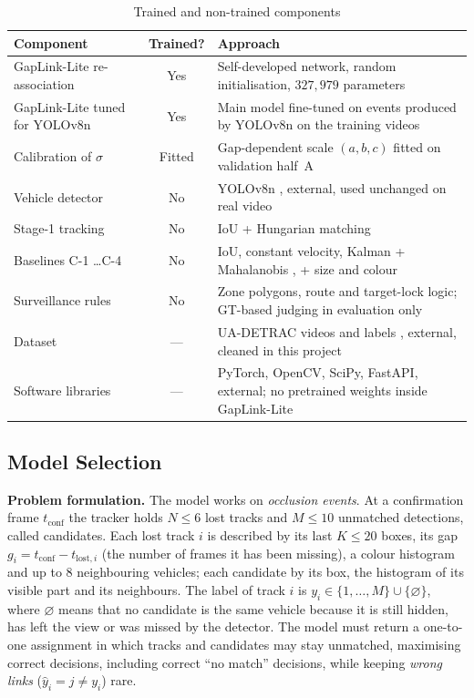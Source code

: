\begin{table}[H]
    \centering
    \caption{Trained and non-trained components}
    \label{tab:trained_components}
    \begin{tabularx}{\textwidth}{l c X}
        \toprule
        \textbf{Component} & \textbf{Trained?} & \textbf{Approach} \\
        \midrule
        GapLink-Lite re-association & Yes & Self-developed network, random initialisation, $327{,}979$ parameters \\
        GapLink-Lite tuned for YOLOv8n & Yes & Main model fine-tuned on events produced by YOLOv8n on the training videos \\
        Calibration of $\sigma$ & Fitted & Gap-dependent scale $(a,b,c)$ fitted on validation half~A \\
        Vehicle detector & No & YOLOv8n \cite{jocher2023yolov8}, external, used unchanged on real video \\
        Stage-1 tracking & No & IoU + Hungarian matching \cite{kuhn1955hungarian} \\
        Baselines C-1 \dots C-4 & No & IoU, constant velocity, Kalman \cite{kalman1960} + Mahalanobis \cite{mahalanobis1936}, + size and colour \\
        Surveillance rules & No & Zone polygons, route and target-lock logic; GT-based judging in evaluation only \\
        Dataset & --- & UA-DETRAC videos and labels \cite{wen2020uadetrac}, external, cleaned in this project \\
        Software libraries & --- & PyTorch, OpenCV, SciPy, FastAPI, external; no pretrained weights inside GapLink-Lite \\
        \bottomrule
    \end{tabularx}
\end{table}

\subsection{Model Selection}
\label{sec:model_selection}

\textbf{Problem formulation.} The model works on \emph{occlusion events}. At a confirmation frame $t_{\text{conf}}$ the tracker holds $N \le 6$ lost tracks and $M \le 10$ unmatched detections, called candidates. Each lost track $i$ is described by its last $K \le 20$ boxes, its gap $g_i = t_{\text{conf}} - t_{\text{lost},i}$ (the number of frames it has been missing), a colour histogram and up to $8$ neighbouring vehicles; each candidate by its box, the histogram of its visible part and its neighbours. The label of track $i$ is $y_i \in \{1,\dots,M\} \cup \{\varnothing\}$, where $\varnothing$ means that no candidate is the same vehicle because it is still hidden, has left the view or was missed by the detector. The model must return a one-to-one assignment in which tracks and candidates may stay unmatched, maximising correct decisions, including correct ``no match'' decisions, while keeping \emph{wrong links} ($\hat{y}_i = j \ne y_i$) rare.


